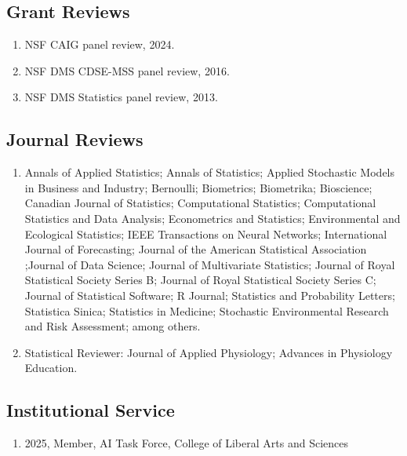 \documentclass[Statistics]{vita}
\begin{document}
\begin{vita}
  \subsection{Grant Reviews}
  \begin{enumerate}
  \item NSF CAIG panel review, 2024.
  \item NSF DMS CDSE-MSS panel review, 2016.
  \item NSF DMS Statistics panel review, 2013.
  \end{enumerate}
  \subsection{Journal Reviews}
  \begin{enumerate}
  \item Annals of Applied Statistics; Annals of Statistics; Applied Stochastic Models in Business and Industry; Bernoulli; Biometrics; Biometrika; Bioscience; Canadian Journal of Statistics; Computational Statistics; Computational Statistics and Data Analysis; Econometrics and Statistics; Environmental and Ecological Statistics; IEEE Transactions on Neural Networks; International Journal of Forecasting; Journal of the American Statistical Association ;Journal of Data Science; Journal of Multivariate Statistics; Journal of Royal Statistical Society Series B; Journal of Royal Statistical Society Series C; Journal of Statistical Software; R Journal; Statistics and Probability Letters; Statistica Sinica; Statistics in Medicine; Stochastic Environmental Research and Risk Assessment; among others.
  \item Statistical Reviewer:  Journal of Applied Physiology; Advances in Physiology Education.
  \end{enumerate}
  \subsection{Institutional Service}
  \begin{enumerate}
  \item 2025, Member, AI Task Force, College of Liberal Arts and Sciences
  \end{enumerate}

\end{vita}
\end{document}

